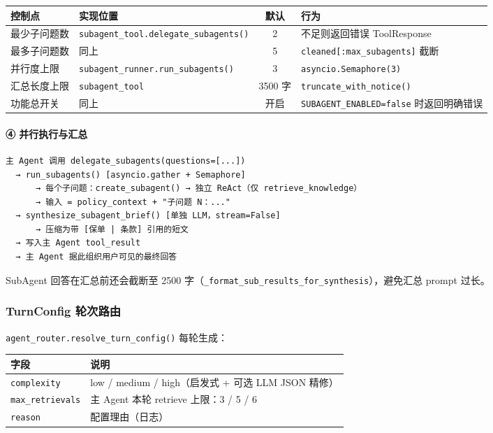 \documentclass[11pt,a4paper]{ctexart}
\begin{document}
\begin{center}
\begin{tabular}{p{2.5cm}p{4cm}cp{5cm}}
\toprule
\textbf{控制点} & \textbf{实现位置} & \textbf{默认} & \textbf{行为} \\
\midrule
最少子问题数 & \texttt{subagent\_tool.delegate\_subagents()} & 2 & 不足则返回错误 ToolResponse \\
最多子问题数 & 同上 & 5 & \texttt{cleaned[:max\_subagents]} 截断 \\
并行度上限 & \texttt{subagent\_runner.run\_subagents()} & 3 & \texttt{asyncio.Semaphore(3)} \\
汇总长度上限 & \texttt{subagent\_tool} & 3500 字 & \texttt{truncate\_with\_notice()} \\
功能总开关 & 同上 & 开启 & \texttt{SUBAGENT\_ENABLED=false} 时返回明确错误 \\
\bottomrule
\end{tabular}
\end{center}

\paragraph{④ 并行执行与汇总}

\begin{lstlisting}
主 Agent 调用 delegate_subagents(questions=[...])
  → run_subagents() [asyncio.gather + Semaphore]
      → 每个子问题：create_subagent() → 独立 ReAct（仅 retrieve_knowledge）
      → 输入 = policy_context + "子问题 N：..."
  → synthesize_subagent_brief() [单独 LLM，stream=False]
      → 压缩为带 [保单 | 条款] 引用的短文
  → 写入主 Agent tool_result
  → 主 Agent 据此组织用户可见的最终回答
\end{lstlisting}

SubAgent 回答在汇总前还会截断至 2500 字（\texttt{\_format\_sub\_results\_for\_synthesis}），避免汇总 prompt 过长。

\subsubsection{TurnConfig 轮次路由}

\texttt{agent\_router.resolve\_turn\_config()} 每轮生成：

\begin{center}
\begin{tabular}{ll}
\toprule
\textbf{字段} & \textbf{说明} \\
\midrule
\texttt{complexity} & low / medium / high（启发式 + 可选 LLM JSON 精修） \\
\texttt{max\_retrievals} & 主 Agent 本轮 retrieve 上限：3 / 5 / 6 \\
\texttt{reason} & 配置理由（日志） \\
\bottomrule
\end{tabular}
\end{center}
\end{document}
